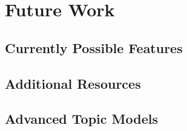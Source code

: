 \chapter{Future Work}



\section{Currently Possible Features}



\section{Additional Resources}



\section{Advanced Topic Models}


